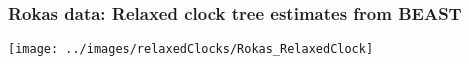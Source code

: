 \begin{frame}
\frametitle{Rokas data: Relaxed clock tree estimates from BEAST}

\begin{centering}

\texttt{[image: ../images/relaxedClocks/Rokas\_RelaxedClock]}

\end{centering}

\end{frame}